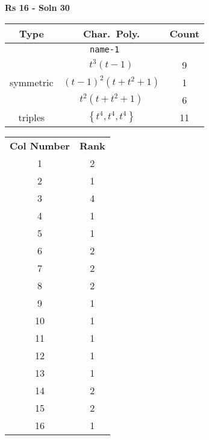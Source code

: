 \documentclass{article}
\begin{document}
    \textbf{Rs 16 - Soln 30}
    \begin{table}
    \begin{tabular}{|c|c|c|}
    \hline
    \textbf{Type} & \textbf{Char.~Poly.} & \textbf{Count} \\
    \hline \multicolumn{3}{|c|}{\texttt{name-1}} \\ \hline
    \multirow{3}{*}{symmetric}
    & $t^3(t - 1)$ & 9 \\
    & $(t - 1)^2(t + t^2 + 1)$ & 1 \\
    & $t^2(t + t^2 + 1)$ & 6 \\
    \hline
    \multirow{1}{*}{triples}
    & $\left\{t^4,t^4,t^4\right\}$ & 11 \\
    \hline
    \end{tabular}
    \end{table}
    \begin{table}
    \begin{tabular}{|c|c|}
    \hline
    \textbf{Col Number} & \textbf{Rank}\\
    1 & 2 \\ 
    2 & 1 \\ 
    3 & 4 \\ 
    4 & 1 \\ 
    5 & 1 \\ 
    6 & 2 \\ 
    7 & 2 \\ 
    8 & 2 \\ 
    9 & 1 \\ 
    10 & 1 \\ 
    11 & 1 \\ 
    12 & 1 \\ 
    13 & 1 \\ 
    14 & 2 \\ 
    15 & 2 \\ 
    16 & 1 \\ 
    \hline
    \end{tabular}
    \end{table}
    \newpage
\end{document}
